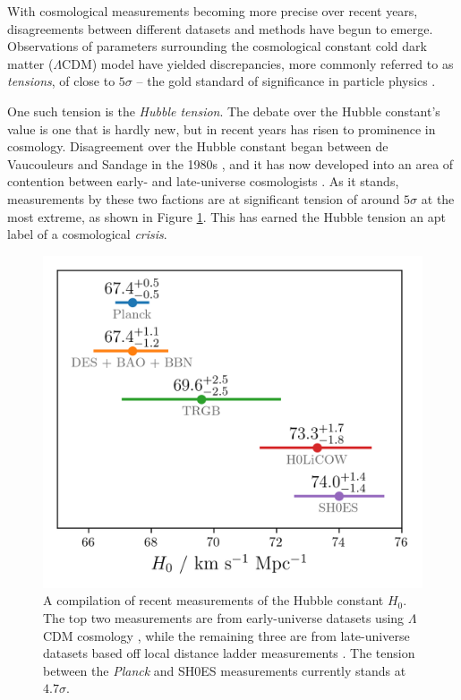 \documentclass[%
 reprint,
 amsmath,amssymb,
 aps,
]{revtex4-2}
\begin{document}
With cosmological measurements becoming more precise over recent years, disagreements between different datasets and methods have begun to emerge. Observations of parameters surrounding the cosmological constant cold dark matter ($\Lambda \textrm{CDM}$) model have yielded discrepancies, more commonly referred to as \textit{tensions}, of close to $5\sigma$ -- the gold standard of significance in particle physics \cite{Franklin2013}. 

One such tension is the \textit{Hubble tension}. The debate over the Hubble constant's value is one that is hardly new, but in recent years has risen to prominence in cosmology. Disagreement over the Hubble constant began between de Vaucouleurs and Sandage in the 1980s \cite{deVaucouleurs1986, Sandage1975}, and it has now developed into an area of contention between early- and late-universe cosmologists \cite{Planck2020, Abbott2018, Freedman2020, Riess2019, Wong2019}. As it stands, measurements by these two factions are at significant tension of around $5\sigma$ at the most extreme, as shown in Figure \ref{H0_tension}. This has earned the Hubble tension an apt label of a cosmological \textit{crisis}.


\begin{figure}
    \includegraphics[width=0.8\columnwidth]{../plots/H0 tension.png}
    \centering
    \caption{A compilation of recent measurements of the Hubble constant $H_0$. The top two measurements are from early-universe datasets using $\Lambda$CDM cosmology \cite{Planck2020, Abbott2018}, while the remaining three are from late-universe datasets based off local distance ladder measurements \cite{Freedman2020, Riess2019, Wong2019}. The tension between the \textit{Planck} and SH0ES measurements currently stands at $4.7 \sigma$.}
    \label{H0_tension}
\end{figure}
\end{document}

